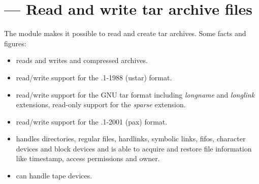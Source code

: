 \section{ --- Read and write tar archive files}



The  module makes it possible to read and create tar archives.
Some facts and figures:

\begin{itemize}
\item reads and writes  and  compressed archives.
\item read/write support for the \POSIX{}.1-1988 (ustar) format.
\item read/write support for the GNU tar format including \emph{longname} and
      \emph{longlink} extensions, read-only support for the \emph{sparse}
      extension.
\item read/write support for the \POSIX{}.1-2001 (pax) format.
\item handles directories, regular files, hardlinks, symbolic links, fifos,
      character devices and block devices and is able to acquire and
      restore file information like timestamp, access permissions and owner.
\item can handle tape devices.
\end{itemize}


